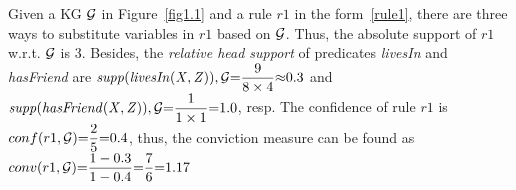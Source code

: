 \begin{example}
Given a KG $\mathcal{G}$ in Figure~\ref{fig1.1} and a rule $r1$ in the form~\ref{rule1}, there are three ways to substitute variables in $r1$ based on $\mathcal{G}$. Thus, the absolute support of $r1$ w.r.t. $\mathcal{G}$ is $3$. Besides, the \textit{relative head support} of predicates \textit{livesIn} and \textit{hasFriend} are $\mathit{supp(livesIn(X,Z)), \mathcal{G}}{=}\dfrac{9}{8 \times 4}{\approx} 0.3$ and  $\mathit{supp(hasFriend(X,Z)), \mathcal{G}}{=}\dfrac{1}{1 \times 1}{=} 1.0$, resp. The confidence of rule $r1$ is $conf(r1, \mathcal{G}) {=} \dfrac{2}{5} {=} 0.4$, thus, the conviction measure can be found as $conv(r1, \mathcal{G}) {=} \dfrac{1-0.3}{1 - 0.4} {=} \dfrac{7}{6} {=} 1.17$
\end{example}